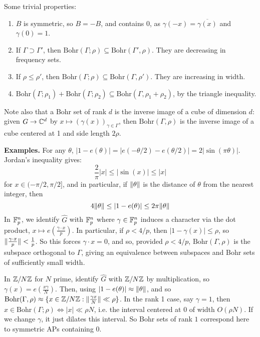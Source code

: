 \documentclass[10pt,a4paper]{article}
\begin{document}
Some trivial properties:
\begin{enumerate}
  \item $B$ is symmetric, so $B = -B$, and contains $0$, as $\gamma(-x) = \overline{\gamma(x)}$ and $\gamma(0) = 1$.
  \item If $\Gamma \supset \Gamma'$, then $\text{Bohr}(\Gamma;\rho) \subseteq \text{Bohr}(\Gamma', \rho)$. They are decreasing in frequency sets.
  \item If $\rho \leq \rho'$, then $\text{Bohr}(\Gamma;\rho) \subseteq \text{Bohr}(\Gamma, \rho')$. They are increasing in width.
  \item $\text{Bohr}(\Gamma;\rho_1) + \text{Bohr}(\Gamma; \rho_2) \subseteq \text{Bohr}(\Gamma, \rho_1+\rho_2)$, by the triangle inequality.
\end{enumerate}
Note also that a Bohr set of rank $d$ is the inverse image of a cube of dimension $d$: given $G \to \mathbb{C}^d$ by $x \mapsto (\gamma(x))_{\gamma \in \Gamma}$, then $\text{Bohr}(\Gamma, \rho)$ is the inverse image of a cube centered at 1 and side length $2\rho$.

\textbf{Examples.}
For any $\theta$, $|1-e(\theta)| = |e(-\theta/2) - e(\theta/2)| = 2|\sin(\pi\theta)|$. Jordan's inequality gives:
\[\frac{2}{\pi}|x| \leq |\sin(x)| \leq |x|\]
for $x \in (-\pi/2,\pi/2]$, and in particular, if $\lVert\theta\rVert$ is the distance of $\theta$ from the nearest integer, then
\[4\lVert\theta\rVert \leq |1-e(\theta)| \leq 2\pi \lVert\theta\rVert\]
In $\mathbb{F}_p^n$, we identify $\hat{G}$ with $\mathbb{F}_p^n$ where $\gamma \in \mathbb{F}_p^n$ induces a character via the dot product, $x \mapsto e(\frac{\gamma \cdot x}{p})$. In particular, if $\rho < 4/p$, then $|1-\gamma(x)| \leq \rho$, so $\lVert\frac{\gamma\cdot x}{p}\rVert <\frac{1}{p}$. So this forces $\gamma \cdot x = 0$, and so, provided $\rho < 4/p$, $\text{Bohr}(\Gamma, \rho)$ is the subspace orthogonal to $\Gamma$, giving an equivalence between subspaces and Bohr sets of sufficiently small width.

In $\mathbb{Z}/N\mathbb{Z}$ for $N$ prime, identify $\hat{G}$ with $\mathbb{Z}/N\mathbb{Z}$ by multiplication, so $\gamma(x) = e(\frac{x\gamma}{N})$. Then, using $|1-e(\theta)| \approx \lVert\theta\rVert$, and so $\text{Bohr}(\Gamma,\rho)\approx \{x \in \mathbb{Z}/N\mathbb{Z} : \lVert\frac{\gamma x}{N}\rVert \ll \rho \}$. In the rank 1 case, say $\gamma = 1$, then $x \in \text{Bohr}(\Gamma;\rho) \iff |x|\ll \rho N$, i.e. the interval centered at 0 of width $O(\rho N)$. If we change $\gamma$, it just dilates this interval. So Bohr sets of rank $1$ correspond here to symmetric APs containing 0.
\end{document}
